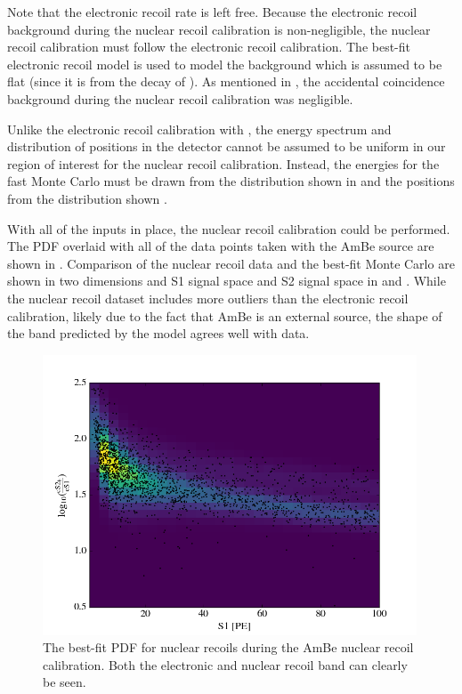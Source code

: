 Note that the electronic recoil rate is left free.  Because the electronic recoil background during the nuclear recoil calibration is non-negligible, the nuclear recoil calibration must follow the electronic recoil calibration.  The best-fit electronic recoil model is used to model the background which is assumed to be flat (since it is from the decay of ).  As mentioned in , the accidental coincidence background during the nuclear recoil calibration was negligible.

Unlike the electronic recoil calibration with , the energy spectrum and distribution of positions in the detector cannot be assumed to be uniform in our region of interest for the nuclear recoil calibration.  Instead, the energies for the fast Monte Carlo must be drawn from the distribution shown in  and the positions from the distribution shown .

With all of the inputs in place, the nuclear recoil calibration could be performed.  The PDF overlaid with all of the data points taken with the AmBe source are shown in .  Comparison of the nuclear recoil data and the best-fit Monte Carlo are shown in two dimensions and S1 signal space and S2 signal space in  and .  While the nuclear recoil dataset includes more outliers than the electronic recoil calibration, likely due to the fact that AmBe is an external source, the shape of the band predicted by the model agrees well with data.


\begin{figure}[t]
	\centering
	\includegraphics[width=0.99\textwidth]{xe1t_nr_cal_pdf}
	\caption{The best-fit PDF for nuclear recoils during the AmBe nuclear recoil calibration.  Both the electronic and nuclear recoil band can clearly be seen.}
	\label{fig:xe1t_nr_cal_pdf}
\end{figure}

